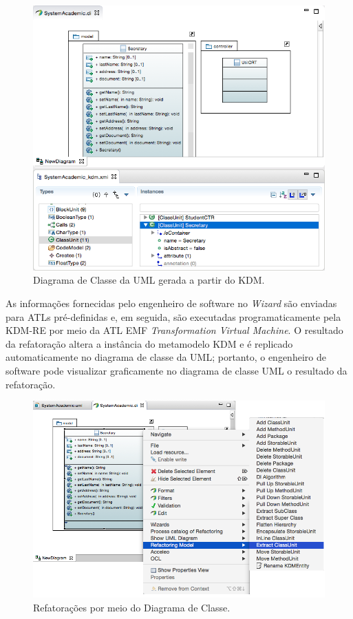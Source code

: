 \begin{figure}[!h]
	\centering
	\caption{Diagrama de Classe da UML gerada a partir do KDM.}
	\label{fig:kdmToUML_diagrama_de_classe}
	\includegraphics[scale=0.5]{images/refatoracao_UML_papyrus}
	\fautor
\end{figure}

As informações fornecidas pelo engenheiro de software no \textit{Wizard} são enviadas para ATLs pré-definidas e, em seguida, são executadas programaticamente pela KDM-RE por meio da ATL EMF \textit{Transformation Virtual Machine}. O resultado da refatoração altera a instância do metamodelo KDM e é replicado automaticamente no diagrama de classe da UML; portanto, o engenheiro de software pode visualizar graficamente no diagrama de classe UML o resultado da refatoração.

\begin{figure}[!h]
	\centering
	\caption{Refatorações por meio do Diagrama de Classe.}
	\label{fig:refatoracao_papyrus_KDM_iteragir}
	\includegraphics[scale=0.5]{images/kdm_uml_papyrus_refactoring_extract_class_new}
	\fautor
\end{figure}

